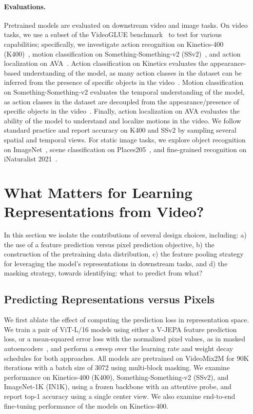 \documentclass[twocolumn]{fairmeta}
\newcommand{\putalg}{{\small V-JEPA}\xspace}
\theoremstyle{plain}
\theoremstyle{definition}
\theoremstyle{remark}
\begin{document}
\paragraph{\bf Evaluations.}
Pretrained models are evaluated on downstream video and image tasks.
On video tasks, we use a subset of the VideoGLUE benchmark~\citep{yuan2023videoglue} to test for various capabilities; specifically, we investigate action recognition on Kinetics-400 (K400)~\citep{kay2017kinetics}, motion classification on Something-Something-v2 (SSv2)~\citep{goyal2017something}, and action localization on AVA~\citep{gu2018ava}.
Action classification on Kinetics evaluates the appearance-based understanding of the model, as many action classes in the dataset can be inferred from the presence of specific objects in the video~\citep{sevilla2021only}.
Motion classification on Something-Something-v2 evaluates the temporal understanding of the model, as action classes in the dataset are decoupled from the appearance/presence of specific objects in the video~\citep{goyal2017something}.
Finally, action localization on AVA evaluates the ability of the model to understand and localize motions in the video.
We follow standard practice and report accuracy on K400 and SSv2 by sampling several spatial and temporal views.
For static image tasks, we explore object recognition on ImageNet~\citep{russakovsky2015imagenet}, scene classification on Places205~\citep{places205}, and fine-grained recognition on iNaturalist 2021~\citep{van2018inaturalist}.

\section{What Matters for Learning Representations from Video?}
\label{sec:ablations}

In this section we isolate the contributions of several design choices, including: a) the use of a feature prediction versus pixel prediction objective, b) the construction of the pretraining data distribution, c) the feature pooling strategy for leveraging the model's representations in downstream tasks, and d) the masking strategy, towards identifying: what to predict from what?

\subsection{Predicting Representations versus Pixels}
\label{subsec:pixel_ablation}
We first ablate the effect of computing the prediction loss in representation space.
We train a pair of ViT-L/16 models using either a \putalg feature prediction loss, or a mean-squared error loss with the normalized pixel values, as in masked autoencoders~\citep{he2021masked}, and perform a sweep over the learning rate and weight decay schedules for both approaches.
All models are pretrained on VideoMix2M for 90K iterations with a batch size of 3072 using multi-block masking.
We examine performance on Kinetics-400 (K400), Something-Something-v2 (SSv2), and ImageNet-1K (IN1K), using a frozen backbone with an attentive probe, and report top-1 accuracy using a single center view.
We also examine end-to-end fine-tuning performance of the models on Kinetics-400.
\end{document}
